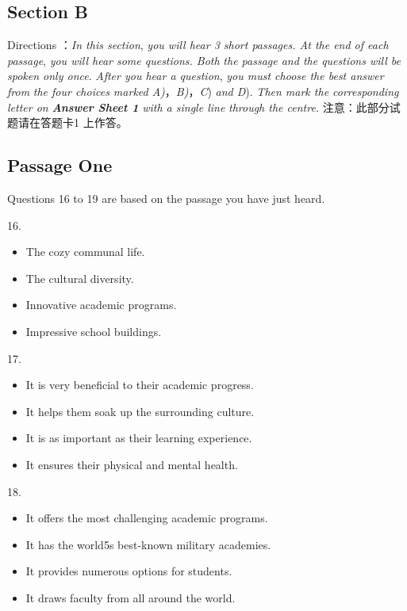 \documentclass[UTF8,11pt]{ctexart}
\begin{document}
\subsection*{\textbf{Section} B}


Directions ：\textit{In this section},\textit{ you will hear 3 short passages. At the end of each passage},\textit{ you will hear some questions. Both} \textit{the passage and the questions will be spoken only once}.\textit{ After you hear a question},\textit{ you must choose the best answer from} \textit{the four choices marked A)}，\textit{B)}，\textit{C})\textit{ and D}).\textit{ Then mark the corresponding letter on}\textbf{\textit{ Answer Sheet 1}}\textit{ with a single line} \textit{through the centre.} 注意：此部分试题请在答题卡1 上作答。


\subsection*{Passage One}


Questions 16 to 19 are based on the passage you have just heard.


16.


\begin{itemize}[leftmargin=2em,itemsep=.2em,topsep=.4em]\item[A.] The cozy communal life.
\item[B.] The cultural diversity.
\item[C.] Innovative academic programs.
\item[D.] Impressive school buildings.
\end{itemize}

17.


\begin{itemize}[leftmargin=2em,itemsep=.2em,topsep=.4em]\item[A.] It is very beneficial to their academic progress.
\item[B.] It helps them soak up the surrounding culture.
\item[C.] It is as important as their learning experience.
\item[D.] It ensures their physical and mental health.
\end{itemize}

18.


\begin{itemize}[leftmargin=2em,itemsep=.2em,topsep=.4em]\item[A.] It offers the most challenging academic programs.
\item[B.] It has the world5s best-known military academies.
\item[C.] It provides numerous options for students.
\item[D.] It draws faculty from all around the world.
\end{itemize}
\end{document}

